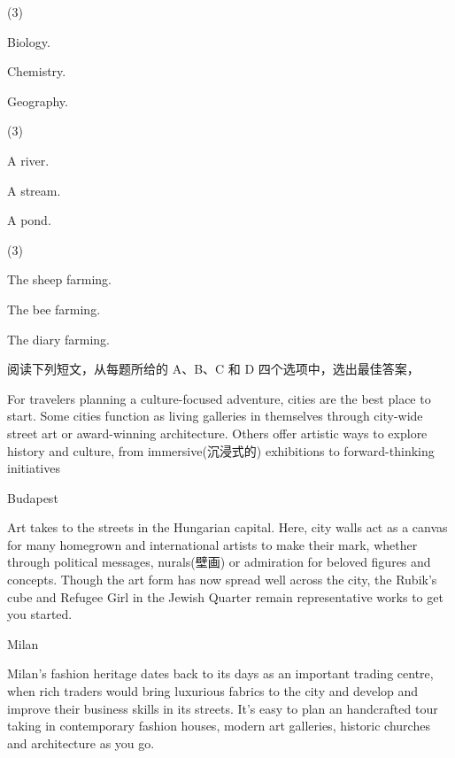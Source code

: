 \documentclass{英语试卷}
\begin{document}
\begin{choices}(3)
  \item Biology.
  \item Chemistry.
  \item Geography.
\end{choices}
\begin{choices}(3)
  \item A river.
  \item A stream.
  \item A pond.
\end{choices}
\begin{choices}(3)
  \item The sheep farming.
  \item The bee farming.
  \item The diary farming.
\end{choices}
\par 阅读下列短文，从每题所给的 A、B、C 和 D 四个选项中，选出最佳答案，\par
{}
\par For travelers planning a culture-focused adventure, cities are the best place to start. Some cities function as living galleries in themselves through city-wide street art or award-winning architecture. Others offer artistic ways to explore history and culture, from immersive(沉浸式的) exhibitions to forward-thinking initiatives\par
\par Budapest\par
\par Art takes to the streets in the Hungarian capital. Here, city walls act as a canvas for many homegrown and international artists to make their mark, whether through political messages, nurals(壁画) or admiration for beloved figures and concepts. Though the art form has now spread well across the city, the Rubik's cube and Refugee Girl in the Jewish Quarter remain representative works to get you started.\par
\par Milan\par
\par Milan's fashion heritage dates back to its days as an important trading centre, when rich traders would bring luxurious fabrics to the city and develop and improve their business skills in its streets. It's easy to plan an handcrafted tour taking in contemporary fashion houses, modern art galleries, historic churches and architecture as you go.\par
\end{document}

